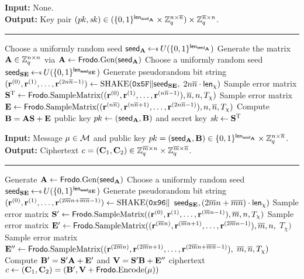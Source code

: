 \documentclass{iacrcc}
\begin{document}
\begin{algorithm}[H]
\caption{\label{alg:PKE:KeyGen} $\FrodoPKE.\KeyGen$.}
{\bf Input:} None.\\
{\bf Output:} Key pair $(\pk, \sk) \in (\{0,1\}^\lengthseedA \times \mathbb{Z}_q^{n \times \nbar})\times \mathbb{Z}_q^{\nbar \times n}$.\\[-1.5ex]
\rule{\linewidth}{.5pt}
\vspace{-0.5cm}
\begin{algorithmic}[1]
    \STATE Choose a uniformly random seed $\seedA \getsr U(\{0,1\}^\lengthseedA)$
    \STATE Generate the matrix $\bfA \in \bbZ_q^{n \times n}$ via $\bfA\gets\Frodo.\gen(\seedA)$
    \STATE Choose a uniformly random seed $\seedSE \getsr U(\{0,1\}^\lengthseedSE)$
    \STATE Generate pseudorandom bit string $ (\bfr^{(0)}, \bfr^{(1)}, \dots, \bfr^{(2n\nbar-1)}) \gets \SHAKE(\mathtt{0x5F} \| \seedSE,$ $2n\nbar \cdot \lengthchi)$
    \STATE Sample error matrix $\bfS^\text{T} \gets \Frodo.\SampV((\bfr^{(0)}, \bfr^{(1)}, \dots, \bfr^{(n\nbar-1)}), \nbar, n, T_\chi)$
    \STATE Sample error matrix $\bfE \gets \Frodo.\SampV((\bfr^{(n\nbar)}, \bfr^{(n\nbar+1)}, \dots, \bfr^{(2n\nbar-1)}), n, \nbar, T_\chi)$
    \STATE Compute $\bfB = \bfA\bfS + \bfE$
    \RETURN public key $\pk \gets (\seedA, \bfB)$ and secret key $\sk \gets \bfS^\text{T}$
\end{algorithmic}
\end{algorithm}
\begin{algorithm}[H]
\caption{\label{alg:PKE:Enc} $\FrodoPKE.\Enc$.}
{\bf Input:} Message $\mu \in \calM$ and public key $\pk = (\seedA, \bfB) \in \{0,1\}^\lengthseedA \times \bbZ_q^{n \times \nbar}$.\\
{\bf Output:} Ciphertext $c = (\bfC_1, \bfC_2) \in \bbZ_q^{\mbar\times n}\times \bbZ_q^{\mbar\times\nbar}$.\\[-1.5ex]
\rule{\linewidth}{.5pt}
\vspace{-0.5cm}
\begin{algorithmic}[1]
    \STATE Generate $\bfA\gets \Frodo.\gen(\seedA)$
    \STATE Choose a uniformly random seed $\seedSE \getsr U(\{0,1\}^\lengthseedSE)$
     \STATE Generate pseudorandom bit string $ (\bfr^{(0)}, \bfr^{(1)}, \dots, \bfr^{(2\mbar n+\mbar\nbar-1)}) \gets \SHAKE(\mathtt{0x96} \|$ $\seedSE, (2\mbar n+\mbar\nbar) \cdot \lengthchi)$
    \STATE Sample error matrix $\bfS' \gets \Frodo.\SampV((\bfr^{(0)}, \bfr^{(1)}, \dots, \bfr^{(\mbar n-1)}), \mbar, n, T_\chi)$
    \STATE Sample error matrix $\bfE' \gets \Frodo.\SampV((\bfr^{(\mbar n)}, \bfr^{(\mbar n+1)}, \dots, \bfr^{(2\mbar n-1)}), \mbar, n,$ $T_\chi)$
    \STATE Sample error matrix $\bfE'' \gets \Frodo.\SampV((\bfr^{(2\mbar n)}, \bfr^{(2\mbar n+1)}, \dots, \bfr^{(2\mbar n+\mbar\nbar-1)}),$ $\mbar, \nbar, T_\chi)$
    \STATE Compute $\bfB' = \bfS'\bfA + \bfE'$ and $\bfV = \bfS'\bfB + \bfE''$
    \RETURN ciphertext $c \gets (\bfC_1, \bfC_2)=(\bfB', \bfV + \Frodo.\Encode(\mu))$
    \end{algorithmic}
\end{algorithm}
\end{document}

